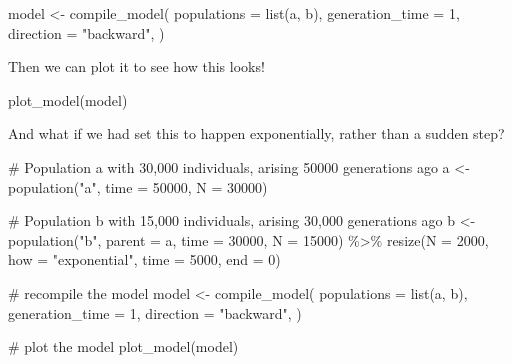 \documentclass[
  letterpaper,
  DIV=11,
  numbers=noendperiod]{scrartcl}
\newenvironment{Shaded}{\begin{snugshade}}{\end{snugshade}}
\newcommand{\AttributeTok}[1]{\textcolor[rgb]{0.40,0.45,0.13}{#1}}
\newcommand{\CommentTok}[1]{\textcolor[rgb]{0.37,0.37,0.37}{#1}}
\newcommand{\DecValTok}[1]{\textcolor[rgb]{0.68,0.00,0.00}{#1}}
\newcommand{\FunctionTok}[1]{\textcolor[rgb]{0.28,0.35,0.67}{#1}}
\newcommand{\NormalTok}[1]{\textcolor[rgb]{0.00,0.23,0.31}{#1}}
\newcommand{\OtherTok}[1]{\textcolor[rgb]{0.00,0.23,0.31}{#1}}
\newcommand{\SpecialCharTok}[1]{\textcolor[rgb]{0.37,0.37,0.37}{#1}}
\newcommand{\StringTok}[1]{\textcolor[rgb]{0.13,0.47,0.30}{#1}}
\begin{document}
\begin{Shaded}
\begin{Highlighting}[]
\NormalTok{model }\OtherTok{\textless{}{-}} \FunctionTok{compile\_model}\NormalTok{(}
  \AttributeTok{populations =} \FunctionTok{list}\NormalTok{(a, b),}
  \AttributeTok{generation\_time =} \DecValTok{1}\NormalTok{,}
  \AttributeTok{direction =} \StringTok{"backward"}\NormalTok{,}
\NormalTok{)}
\end{Highlighting}
\end{Shaded}

Then we can plot it to see how this looks!

\begin{Shaded}
\begin{Highlighting}[]
\FunctionTok{plot\_model}\NormalTok{(model)}
\end{Highlighting}
\end{Shaded}

And what if we had set this to happen exponentially, rather than a
sudden step?

\begin{Shaded}
\begin{Highlighting}[]
\CommentTok{\# Population a with 30,000 individuals, arising 50000 generations ago}
\NormalTok{a }\OtherTok{\textless{}{-}} \FunctionTok{population}\NormalTok{(}\StringTok{"a"}\NormalTok{, }\AttributeTok{time =} \DecValTok{50000}\NormalTok{, }\AttributeTok{N =} \DecValTok{30000}\NormalTok{)}

\CommentTok{\# Population b with 15,000 individuals, arising 30,000 generations ago}
\NormalTok{b }\OtherTok{\textless{}{-}} \FunctionTok{population}\NormalTok{(}\StringTok{"b"}\NormalTok{, }\AttributeTok{parent =}\NormalTok{ a, }\AttributeTok{time =} \DecValTok{30000}\NormalTok{, }\AttributeTok{N =} \DecValTok{15000}\NormalTok{) }\SpecialCharTok{\%\textgreater{}\%}
  \FunctionTok{resize}\NormalTok{(}\AttributeTok{N =} \DecValTok{2000}\NormalTok{, }\AttributeTok{how =} \StringTok{"exponential"}\NormalTok{, }\AttributeTok{time =} \DecValTok{5000}\NormalTok{, }\AttributeTok{end =} \DecValTok{0}\NormalTok{)}

\CommentTok{\# recompile the model}
\NormalTok{model }\OtherTok{\textless{}{-}} \FunctionTok{compile\_model}\NormalTok{(}
  \AttributeTok{populations =} \FunctionTok{list}\NormalTok{(a, b),}
  \AttributeTok{generation\_time =} \DecValTok{1}\NormalTok{,}
  \AttributeTok{direction =} \StringTok{"backward"}\NormalTok{,}
\NormalTok{)}

\CommentTok{\# plot the model}
\FunctionTok{plot\_model}\NormalTok{(model)}
\end{Highlighting}
\end{Shaded}
\end{document}
